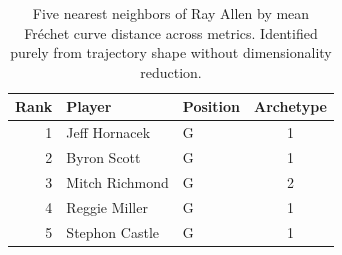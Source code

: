 \begin{table}[htbp]
  \centering\small
  \begin{tabular}{rllc}
    \toprule
    Rank & Player & Position & Archetype \\
    \midrule
    1 & Jeff Hornacek & G & 1 \\
    2 & Byron Scott & G & 1 \\
    3 & Mitch Richmond & G & 2 \\
    4 & Reggie Miller & G & 1 \\
    5 & Stephon Castle & G & 1 \\
    \bottomrule
  \end{tabular}
  \caption{Five nearest neighbors of Ray Allen by mean Fr\'{e}chet curve distance across metrics. Identified purely from trajectory shape without dimensionality reduction.}
  \label{tab:Ray_Allen_frechet_curve_neighbors}
\end{table}

